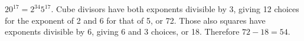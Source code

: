 $ 20^{17}=2^{34}5^{17}$. Cube divisors have both exponents divisible by 3, giving 12 choices for the exponent of 2 and 6 for that of 5, or 72. Those also squares have exponents divisible by 6, giving 6 and 3 choices, or 18. Therefore $\boxed{72-18=54}$.
